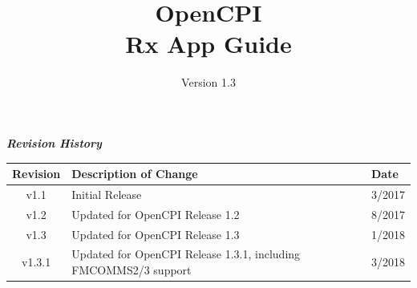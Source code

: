 \def\docTitle{OpenCPI\\ Rx App Guide}
\def\docVersion{1.3}

\date{Version \docVersion} %
\title{\docTitle}
\usepackage{graphicx}
\graphicspath{ {figures/} }
\usepackage{textcomp}


\maketitle
\newpage
	\begin{center}
	\textit{\textbf{Revision History}}
		\begin{table}[H]
		\label{table:revisions} %
			\begin{tabularx}{\textwidth}{|c|X|l|}
			\hline
			\rowcolor{blue}
			\textbf{Revision} & \textbf{Description of Change} & \textbf{Date} \\
		    \hline
		    v1.1 & Initial Release & 3/2017 \\
		    \hline
		    v1.2 & Updated for OpenCPI Release 1.2 & 8/2017 \\
			\hline
			v1.3 & Updated for OpenCPI Release 1.3 & 1/2018 \\
			\hline
			v1.3.1 & Updated for OpenCPI Release 1.3.1, including FMCOMMS2/3 support & 3/2018 \\
			\hline
			\end{tabularx}
		\end{table}
	\end{center}

